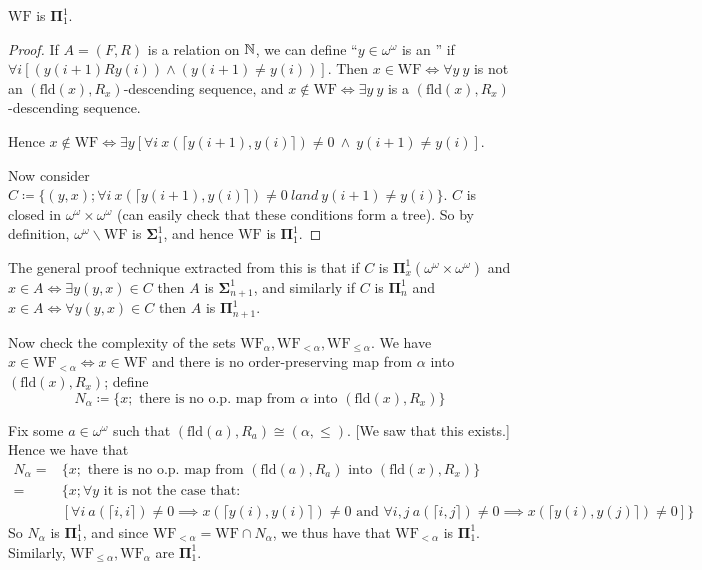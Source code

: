 \documentclass[]{article}
\newcommand{\om}{\omega}
\newcommand{\bosig}{\bm{\Sigma}}
\newcommand{\bopi}{\bm{\Pi}}
\newcommand{\fld}{\textrm{fld}}
\newcommand{\wf}{\textrm{WF}}
\begin{document}
 \begin{theorem*}
     $\wf$ is $\bopi^1_1$.
 \end{theorem*}
 \begin{proof}
     If $A = (F,R)$ is a relation on $\mathbb{N}$, we can define ``$y\in\om^\om$ is an '' if $\forall i[(y(i+1)Ry(i))\land(y(i+1)\ne y(i))]$. Then $x\in \wf \iff \forall y\ y$ is not an $(\fld(x),R_x)$-descending sequence, and $x \not\in \wf\iff \exists y\ y$ is a $(\fld(x),R_x)$-descending sequence.

     Hence $ x \not\in \wf \iff \exists y [\forall i\ x(\lceil y(i+1),y(i)\rceil)\ne0\ \land\ y(i+1)\ne y(i)]$.

     Now consider $C\coloneqq \{(y,x); \forall i\ x(\lceil y(i+1),y(i)\rceil)\ne 0\ land\ y(i+1)\ne y(i)\}$. $C$ is closed in $\om^\om\times\om^\om$ (can easily check that these conditions form a tree). So by definition, $\om^\om \backslash \wf$ is $\bosig^1_1$, and hence $\wf$ is $\bopi^1_1$.
 \end{proof}

\begin{remark*}
    The general proof technique extracted from this is that if $C$ is $\bopi^1_x(\om^\om\times\om^\om)$ and $x \in A \iff \exists y (y,x)\in C$ then $A$ is $\bosig^1_{n+1}$, and similarly if $C$ is $\bopi^1_n$ and $x \in A \iff \forall y (y,x)\in C$ then $A$ is $\bopi^1_{n+1}$.
\end{remark*}

Now check the complexity of the sets $\wf_\alpha,\wf_{<\alpha},\wf_{\le\alpha}$. We have $x\in \wf_{<\alpha} \iff x \in \wf$ and there is no order-preserving map from $\alpha$ into $(\fld(x),R_x)$; define $$N_\alpha \coloneqq \{x; \textrm{ there is no o.p. map from }\alpha \textrm{ into } (\fld(x),R_x)\}$$

Fix some $a \in \om^\om$ such that $(\fld(a),R_a)\cong (\alpha,\le)$. [We saw that this exists.] Hence we have that
\begin{align*}
    N_\alpha =&\{x;\textrm{ there is no o.p. map from }(\fld(a),R_a)\textrm{ into }(\fld(x),R_x)\}\\
    =& \big\{x; \forall y\textrm{ it is not the case that: }\\
    &[\forall i\ a(\lceil i,i\rceil)\ne 0 \implies x(\lceil y(i),y(i)\rceil)\ne 0\textrm{ and }\forall i,j\ a(\lceil i,j\rceil)\ne0 \implies x(\lceil y(i),y(j)\rceil)\ne 0]\big\}
\end{align*}
So $N_\alpha$ is $\bopi^1_1$, and since $\wf_{<\alpha} = \wf \cap N_\alpha$, we thus have that $\wf_{<\alpha}$ is $\bopi^1_1$. Similarly, $\wf_{\le \alpha},\wf_\alpha$ are $\bopi^1_1$.
\end{document}
